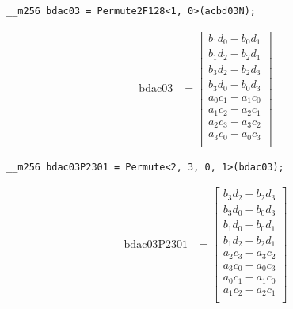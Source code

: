 \begin{verbatim}
__m256 bdac03 = Permute2F128<1, 0>(acbd03N);
\end{verbatim} 

\begin{align*}
\mathrm{bdac03} 
&=
\begin{bmatrix}
b_1d_0 - b_0d_1\\
b_1d_2 - b_2d_1\\
b_3d_2 - b_2d_3\\
b_3d_0 - b_0d_3\\
a_0c_1 - a_1c_0\\
a_1c_2 - a_2c_1\\
a_2c_3 - a_3c_2\\
a_3c_0 - a_0c_3\\
\end{bmatrix}
\end{align*}

\begin{verbatim}
__m256 bdac03P2301 = Permute<2, 3, 0, 1>(bdac03);
\end{verbatim} 
\begin{align*}
\mathrm{bdac03P2301} 
&=
\begin{bmatrix}
b_3d_2 - b_2d_3\\
b_3d_0 - b_0d_3\\
b_1d_0 - b_0d_1\\
b_1d_2 - b_2d_1\\
a_2c_3 - a_3c_2\\
a_3c_0 - a_0c_3\\
a_0c_1 - a_1c_0\\
a_1c_2 - a_2c_1\\
\end{bmatrix}
\end{align*}


